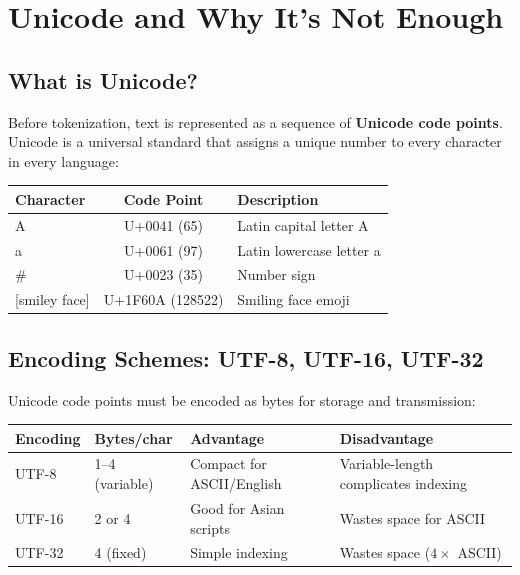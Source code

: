 \documentclass[11pt,a4paper]{article}
\begin{document}
\section{Unicode and Why It's Not Enough}

\subsection{What is Unicode?}

Before tokenization, text is represented as a sequence of \textbf{Unicode code points}. Unicode is a universal standard that assigns a unique number to every character in every language:

\begin{center}
\begin{tabular}{@{}lcl@{}}
\toprule
\textbf{Character} & \textbf{Code Point} & \textbf{Description} \\
\midrule
A & U+0041 (65) & Latin capital letter A \\
a & U+0061 (97) & Latin lowercase letter a \\
\textsf{\#} & U+0023 (35) & Number sign \\
{[smiley face]} & U+1F60A (128522) & Smiling face emoji \\
\bottomrule
\end{tabular}
\end{center}

\subsection{Encoding Schemes: UTF-8, UTF-16, UTF-32}

Unicode code points must be encoded as bytes for storage and transmission:

\begin{center}
\renewcommand{\arraystretch}{1.3}
\begin{tabular}{@{}p{2.5cm}p{3cm}p{3cm}p{4cm}@{}}
\toprule
\textbf{Encoding} & \textbf{Bytes/char} & \textbf{Advantage} & \textbf{Disadvantage} \\
\midrule
UTF-8 & 1--4 (variable) & Compact for ASCII/English & Variable-length complicates indexing \\
UTF-16 & 2 or 4 & Good for Asian scripts & Wastes space for ASCII \\
UTF-32 & 4 (fixed) & Simple indexing & Wastes space ($4\times$ ASCII) \\
\bottomrule
\end{tabular}
\end{center}
\end{document}
